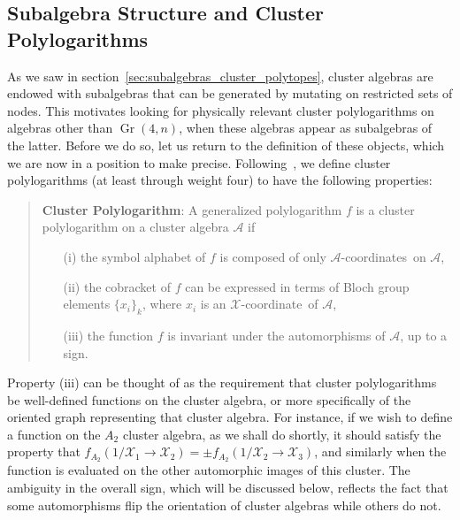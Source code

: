 \documentclass[12pt]{article}
\DeclareMathOperator{\Gr}{Gr}
\def\x{\mathcal{X}}
\def\xcoord{$\mathcal{X}$-coordinate}
\def\a{\mathcal{A}}
\def\acoords{$\mathcal{A}$-coordinates}
\begin{document}
\subsection{Subalgebra Structure and Cluster Polylogarithms}

As we saw in section~\ref{sec:subalgebras_cluster_polytopes}, cluster algebras are endowed with subalgebras that can be generated by mutating on restricted sets of nodes. This motivates looking for physically relevant cluster polylogarithms on algebras other than $\Gr(4,n)$, when these algebras appear as subalgebras of the latter. Before we do so, let us return to the definition of these objects, which we are now in a position to make precise. Following~\cite{Golden:2014xqa}, we define cluster polylogarithms (at least through weight four) to have the following properties:
\begin{quote}
{\bf Cluster Polylogarithm}: A generalized polylogarithm $f$ is a cluster polylogarithm on a cluster algebra $\a$ if
\vspace{-.2cm}
 \begin{itemize}
 \item[(i)] the symbol alphabet of $f$ is composed of only \acoords\ on $\a$, 
 \item[(ii)] the cobracket of $f$ can be expressed in terms of Bloch group elements $\{x_i \}_k$, where $x_i$ is an \xcoord\ of $\a$,
 \item[(iii)] the function $f$ is invariant under the automorphisms of $\a$, up to a sign.
 \end{itemize}
\end{quote}
Property (iii) can be thought of as the requirement that cluster polylogarithms be well-defined functions on the cluster algebra, or more specifically of the oriented graph representing that cluster algebra. For instance, if we wish to define a function on the $A_2$ cluster algebra, as we shall do shortly, it should satisfy the property that $f_{A_2}(1/\x_1\to\x_2)=\pm f_{A_2}(1/\x_2\to\x_3)$, and similarly when the function is evaluated on the other automorphic images of this cluster. The ambiguity in the overall sign, which will be discussed below, reflects the fact that some automorphisms flip the orientation of cluster algebras while others do not.
\end{document}
